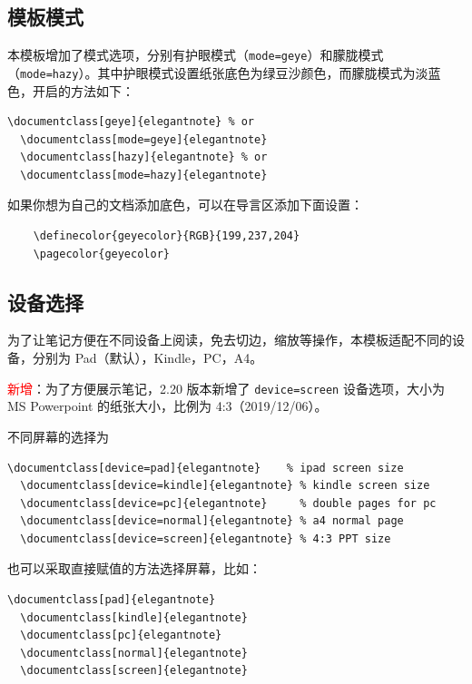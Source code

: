 \documentclass[cn,blue,12pt,normal]{elegantnote}
\begin{document}
\subsection{模板模式}

本模板增加了模式选项，分别有护眼模式（\lstinline{mode=geye}）和朦胧模式（\lstinline{mode=hazy}）。其中护眼模式设置纸张底色为绿豆沙颜色，而朦胧模式为淡蓝色，开启的方法如下：
\begin{lstlisting}[frame=none]  
  \documentclass[geye]{elegantnote} % or
  \documentclass[mode=geye]{elegantnote}
  \documentclass[hazy]{elegantnote} % or
  \documentclass[mode=hazy]{elegantnote}
\end{lstlisting}

\begin{remark}
  如果你想为自己的文档添加底色，可以在导言区添加下面设置：
  \begin{lstlisting}
    \definecolor{geyecolor}{RGB}{199,237,204}
    \pagecolor{geyecolor}
  \end{lstlisting}
\end{remark}


\subsection{设备选择}

为了让笔记方便在不同设备上阅读，免去切边，缩放等操作，本模板适配不同的设备，分别为 Pad（默认），Kindle，PC，A4。

\textcolor{red}{\kaishu 新增}：为了方便展示笔记，2.20 版本新增了 \lstinline{device=screen} 设备选项，大小为 MS Powerpoint 的纸张大小，比例为 4:3（2019/12/06）。

不同屏幕的选择为
\begin{lstlisting}[frame=none]  
  \documentclass[device=pad]{elegantnote}    % ipad screen size
  \documentclass[device=kindle]{elegantnote} % kindle screen size
  \documentclass[device=pc]{elegantnote}     % double pages for pc 
  \documentclass[device=normal]{elegantnote} % a4 normal page
  \documentclass[device=screen]{elegantnote} % 4:3 PPT size
\end{lstlisting}
\begin{note}
也可以采取直接赋值的方法选择屏幕，比如：
\end{note}
\begin{lstlisting}[frame=none]  
  \documentclass[pad]{elegantnote}
  \documentclass[kindle]{elegantnote}
  \documentclass[pc]{elegantnote}
  \documentclass[normal]{elegantnote}
  \documentclass[screen]{elegantnote}
\end{lstlisting}
\end{document}
